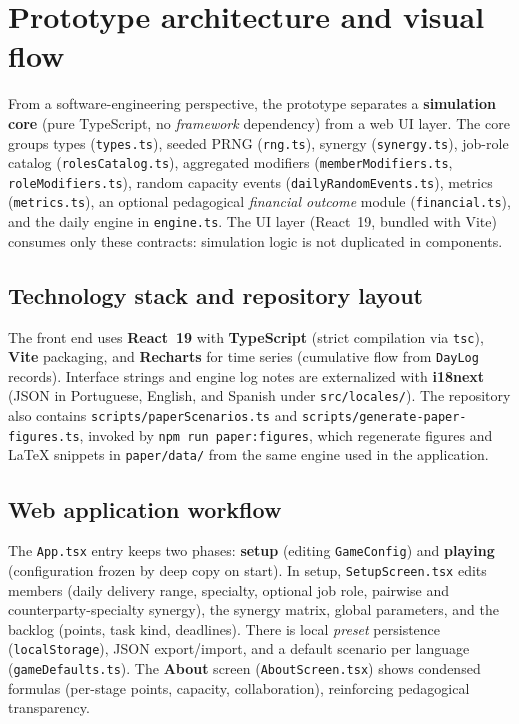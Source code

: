 \section{Prototype architecture and visual flow}
\label{sec:arquitetura}

From a software-engineering perspective, the prototype separates a \textbf{simulation core} (pure TypeScript, no \emph{framework} dependency) from a web UI layer. The core groups types (\texttt{types.ts}), seeded PRNG (\texttt{rng.ts}), synergy (\texttt{synergy.ts}), job-role catalog (\texttt{rolesCatalog.ts}), aggregated modifiers (\texttt{memberModifiers.ts}, \texttt{roleModifiers.ts}), random capacity events (\texttt{dailyRandomEvents.ts}), metrics (\texttt{metrics.ts}), an optional pedagogical \emph{financial outcome} module (\texttt{financial.ts}), and the daily engine in \texttt{engine.ts}. The UI layer (React~19, bundled with Vite) consumes only these contracts: simulation logic is not duplicated in components.

\subsection{Technology stack and repository layout}
The front end uses \textbf{React~19} with \textbf{TypeScript} (strict compilation via \texttt{tsc}), \textbf{Vite} packaging, and \textbf{Recharts} for time series (cumulative flow from \texttt{DayLog} records). Interface strings and engine log notes are externalized with \textbf{i18next} (JSON in Portuguese, English, and Spanish under \texttt{src/locales/}). The repository also contains \texttt{scripts/paperScenarios.ts} and \texttt{scripts/generate-paper-figures.ts}, invoked by \texttt{npm run paper:figures}, which regenerate figures and \LaTeX{} snippets in \texttt{paper/data/} from the same engine used in the application.

\subsection{Web application workflow}
The \texttt{App.tsx} entry keeps two phases: \textbf{setup} (editing \texttt{GameConfig}) and \textbf{playing} (configuration frozen by deep copy on start). In setup, \texttt{SetupScreen.tsx} edits members (daily delivery range, specialty, optional job role, pairwise and counterparty-specialty synergy), the synergy matrix, global parameters, and the backlog (points, task kind, deadlines). There is local \emph{preset} persistence (\texttt{localStorage}), JSON export/import, and a default scenario per language (\texttt{gameDefaults.ts}). The \textbf{About} screen (\texttt{AboutScreen.tsx}) shows condensed formulas (per-stage points, capacity, collaboration), reinforcing pedagogical transparency.

